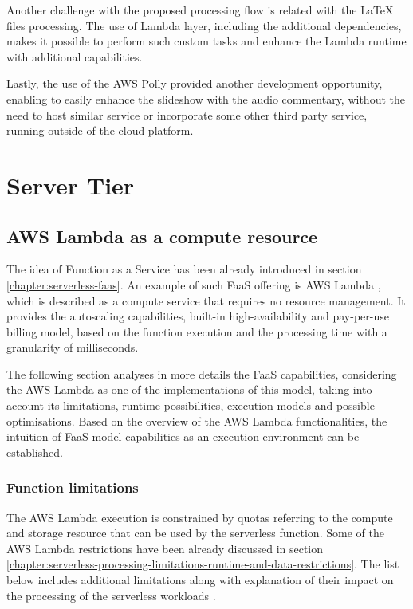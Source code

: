 Another challenge with the proposed processing flow is related with the LaTeX files processing. The use of Lambda layer, including the additional dependencies, makes it possible to perform such custom tasks and enhance the Lambda runtime with additional capabilities.

Lastly, the use of the AWS Polly provided another development opportunity, enabling to easily enhance the slideshow with the audio commentary, without the need to host similar service or incorporate some other third party service, running outside of the cloud platform.

\section{Server Tier}

\subsection{AWS Lambda as a compute resource} \label{chapter:lambda-function-as-a-compute-resource}

The idea of Function as a Service has been already introduced in section \ref{chapter:serverless-faas}.
An example of such FaaS offering is AWS Lambda \cite{AWSLambda}, which is described as a compute service that requires no resource management. It provides the autoscaling capabilities, built-in high-availability and pay-per-use billing model, based on the function execution and the processing time with a granularity of milliseconds. 

The following section analyses in more details the FaaS capabilities, considering the AWS Lambda as one of the implementations of this model, taking into account its limitations, runtime possibilities, execution models and possible optimisations.
Based on the overview of the AWS Lambda functionalities, the intuition of FaaS model capabilities as an execution environment can be established.

\subsubsection{Function limitations} \label{chapter:lambda-function-limitations}

The AWS Lambda execution is constrained by quotas referring to the compute and storage resource that can be used by the serverless function.
Some of the AWS Lambda restrictions have been already discussed in section \ref{chapter:serverless-processing-limitations-runtime-and-data-restrictions}.
The list below includes additional limitations along with explanation of their impact on the processing of the serverless workloads \cite{AWSLambdaQuotas}.

